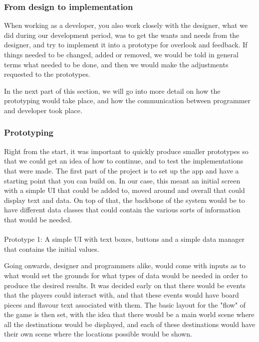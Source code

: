 \subsubsection{From design to implementation}
When working as a developer, you also work closely with the designer, what we did during our development period, was to get the wants and needs from the designer, and try to implement it into a prototype for overlook and feedback. If things needed to be changed, added or removed, we would be told in general terms what needed to be done, and then we would make the adjustments requested to the prototypes.

In the next part of this section, we will go into more detail on how the prototyping would take place, and how the communication between programmer and developer took place.

\subsubsection{Prototyping}
Right from the start, it was important to quickly produce smaller prototypes so that we could get an idea of how to continue, and to test the implementations that were made. The first part of the project is to set up the app and have a starting point that you can build on. In our case, this meant an initial screen with a simple UI that could be added to, moved around and overall that could display text and data. On top of that, the backbone of the system would be to have different data classes that could contain the various sorts of information that would be needed.\\\\ 

Prototype 1: 
A simple UI with text boxes, buttons and a simple data manager that contains the initial values.

Going onwards, designer and programmers alike, would come with inputs as to what would set the grounds for what types of data would be needed in order to produce the desired results.
It was decided early on that there would be events that the players could interact with, and that these events would have board pieces and flavour text associated with them. The basic layout for the "flow" of the game is then set, with the idea that there would be a main world scene where all the destinations would be displayed, and each of these destinations would have their own scene where the locations possible would be shown.\\\\

